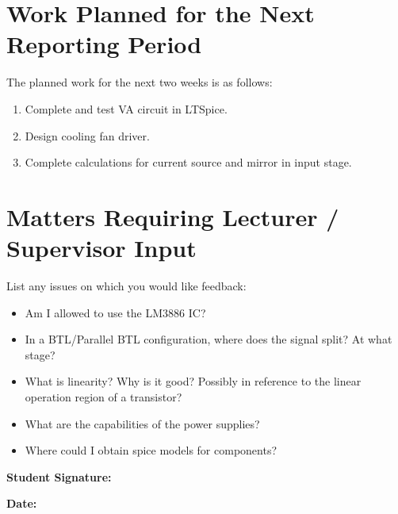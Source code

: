 \documentclass[11pt,a4paper]{article}
\begin{document}
	\section{Work Planned for the Next Reporting Period}
	
	The planned work for the next two weeks is as follows:
	\begin{enumerate}[label=\arabic*.]
		\item Complete and test VA circuit in LTSpice.
		\item Design cooling fan driver.
		\item Complete calculations for current source and mirror in input stage.
	\end{enumerate}
	
	\section{Matters Requiring Lecturer / Supervisor Input}
	
	List any issues on which you would like feedback:
	\begin{itemize}
		\item Am I allowed to use the LM3886 IC?
		\item In a BTL/Parallel BTL configuration, where does the signal split? At what stage?
		\item What is linearity? Why is it good? Possibly in reference to the linear operation region of a transistor?
		\item What are the capabilities of the power supplies?
		\item Where could I obtain spice models for components?
	\end{itemize}
	
	\vspace{1cm}
	
	\noindent\textbf{Student Signature:} \hrulefill
	
	\vspace{0.8cm}
	
	\noindent\textbf{Date:} \hrulefill
	
\end{document}
